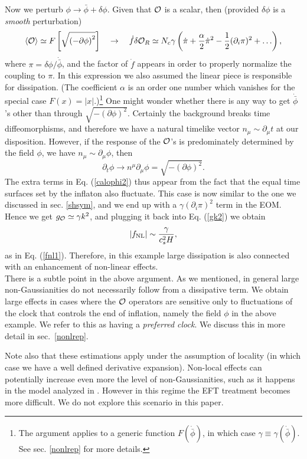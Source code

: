 \documentclass[11pt,amsmath,floats,floatfix,nofootinbib,secnumarabic, superscriptaddress, tightenlines]{revtex4}
\newcommand{\beq}{\begin{equation}}
\newcommand{\eeq}{\end{equation}}
\newcommand{\calo}{{\cal O}}
\newcommand{\bphi}{{\bar\phi}}
\begin{document}
{Now we perturb $\phi \to \bphi +\delta\phi$. Given that $\calo$ is a scalar, then (provided $\delta\phi$ is a {\it smooth} perturbation)
\beq
\label{calophi2}
 \langle\calo\rangle \simeq F\left[\sqrt{\left(-\partial\phi\right)^2}\right]\quad \to\quad \dot f\delta\calo_R \simeq N_c \gamma \left(\dot \pi + \frac{\alpha}{2}\dot\pi^2 -\frac{1}{2} (\partial_i\pi)^2+\ldots\right),
\eeq
where $\pi = \delta\phi/\dot\bphi$, and the factor of $\dot f$ appears in order to properly normalize the coupling to $\pi$. In this expression we also assumed the linear piece is responsible for dissipation. (The coefficient $\alpha$ is an order one number which vanishes for the special case $F(x)=|x|$.)\footnote{The argument applies to a generic function $F(\dot\bphi)$, in which case $\gamma \equiv \gamma(\dot\bphi)$. See sec. \ref{nonlrep} for more details.}
One might wonder whether there is any way to get $\dot\bphi$'s other than through $\sqrt{-\left(\partial\phi\right)^2}$. Certainly the background breaks time diffeomorphisms, and therefore we have a natural timelike vector $n_\mu \sim \partial_\mu t$ at our disposition. However, if the response of the $\calo$'s is predominately determined by the field $\phi$, we have $n_\mu \sim \partial_\mu\phi$, then 
\beq \partial_t \phi \to n^\mu \partial_\mu \phi = \sqrt{-(\partial\phi)^2}.\eeq
The extra terms in Eq. (\ref{calophi2}) thus appear from the fact that the equal time surfaces set by the inflaton also fluctuate. This case is now similar to the one we discussed in sec. \ref{shsym}, and we end up with a $\gamma (\partial_i \pi)^2$ term in the EOM. Hence we get $g_\calo \simeq \gamma k^2$, and plugging it back into Eq. (\ref{gk2}) we obtain
\beq
|f_{\rm NL}| \sim \frac{\gamma}{c_s^2 H},
\eeq
as in Eq. (\ref{fnl1}). Therefore, in this example large dissipation is also connected with an enhancement of non-linear effects.\\

There is a subtle point in the above argument. As we mentioned, in general large non-Gaussianities do not necessarily follow from a dissipative term. We obtain large effects in cases where the $\calo$ operators are sensitive only to fluctuations of the clock that controls the end of inflation, namely the field $\phi$ in the above example. We refer to this as having a {\it preferred clock}. We discuss this in more detail in sec.~\ref{nonlrep}.

Note also that these estimations apply under the assumption of locality (in which case we have a well defined derivative expansion). Non-local effects can potentially increase even more the level of non-Gaussianities, such as it happens in the model analyzed in \cite{trapped}. However in this regime the EFT treatment becomes more difficult. We do not explore this scenario in this paper.

}
\end{document}
